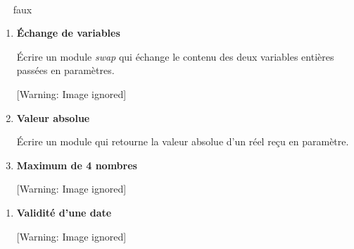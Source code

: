 {\sffamily
\ \  }

{\sffamily
\ \  faux}

{\sffamily
{} }

\liststyleExercice
\setcounter{saveenum}{\value{enumi}}
\begin{enumerate}
\setcounter{enumi}{\value{saveenum}}
\item {\sffamily\bfseries
Échange de variables}

{
Écrire un module \textit{swap} qui échange le contenu des deux variables
entières passées en paramètres.}
\begin{center}
 [Warning: Image ignored] %

\end{center}
\item {\sffamily\bfseries
Valeur absolue}

{
Écrire un module qui retourne la valeur absolue d'un
réel reçu en paramètre.}
\item {\sffamily\bfseries
Maximum de 4 nombres}
\begin{center}
 [Warning: Image ignored] %

\end{center}
\end{enumerate}
{
}

\liststyleExercice
\setcounter{saveenum}{\value{enumi}}
\begin{enumerate}
\setcounter{enumi}{\value{saveenum}}
\item {\sffamily\bfseries
Validité d'une date}
\begin{center}
 [Warning: Image ignored] %

\end{center}
\end{enumerate}
{
}

